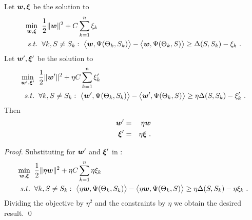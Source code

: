 \begin{proposition}
  Let $\Model,\Slacks$ be the solution to
  \begin{equation}
    \begin{split}
      \min_{\Model,\Slacks} &
      \hspace{2mm} 
      \frac{1}{2} \|\Model\|^2 +
      C \sum_{k=1}^n \Slack_k\\
      s.t. & \hspace{2mm} \forall k, \Seam \neq \Seam_k:~
      \bigl\langle\Model, \JointFtr(\Features_k,\Seam_k)\bigr\rangle -
      \bigl\langle\Model, \JointFtr(\Features_k,\Seam)\bigr\rangle
      \geq
      \Loss(\Seam,\Seam_k) - \Slack_k ~.
    \end{split}
    \label{eq:svm-problem}
  \end{equation}
  Let $\Model',\Slacks'$ be the solution to
  \begin{equation}
    \begin{split}
      \min_{\Model',\Slacks'} &
      \hspace{2mm} 
      \frac{1}{2} \|\Model'\|^2 +
      \eta C \sum_{k=1}^n \Slack_k'\\
      s.t. & \hspace{2mm} \forall k, \Seam \neq \Seam_k:~
      \bigl\langle\Model', \JointFtr(\Features_k,\Seam_k)\bigr\rangle -
      \bigl\langle\Model', \JointFtr(\Features_k,\Seam)\bigr\rangle
      \geq
      \eta \Loss(\Seam,\Seam_k) - \Slack_k' ~.
    \end{split}
    \label{eq:equiv-problem}
  \end{equation}
  Then
  \begin{eqnarray}
    \Model' &=& \eta \Model\\
    \Slacks' &=& \eta \Slacks ~.
  \end{eqnarray}
\end{proposition}
\begin{proof}
  Substituting for $\boldsymbol{w}'$ and $\Slacks'$ in :
  \begin{equation}
    \begin{split}
      \min_{\Model,\Slacks} &
      \hspace{2mm} 
      \frac{1}{2} \| \eta \Model \|^2 +
      \eta C \sum_{k=1}^n \eta \Slack_k\\
      s.t. & \hspace{2mm} \forall k, \Seam \neq \Seam_k:~
      \bigl\langle\eta\Model, \JointFtr(\Features_k,\Seam_k)\bigr\rangle -
      \bigl\langle\eta\Model, \JointFtr(\Features_k,\Seam)\bigr\rangle
      \geq
      \eta \Loss(\Seam,\Seam_k) - \eta\Slack_k ~.
    \end{split}
    \label{eq:problem2}
  \end{equation}
  Dividing the objective by $\eta^2$ and the constraints by $\eta$
  we obtain the desired result.
  \qed
\end{proof}

